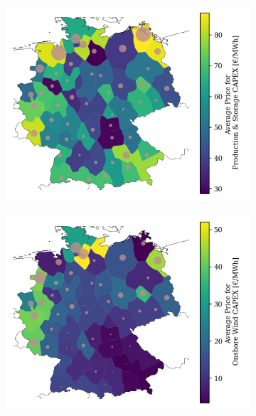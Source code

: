 \documentclass[11pt,twocolumn]{article}
\begin{document}
\begin{figure}
    \centering
    \begin{subfigure}[c]{.49\linewidth}
        \includegraphics[width=\linewidth]{de50/maps_price/one_port_investment_cost}
        \label{fig:total_capex}
    \end{subfigure}
    \begin{subfigure}[c]{.49\linewidth}
        \includegraphics[width=\linewidth]{de50/maps_price/by_carrier/onwind_one_port_investment_cost}
        \label{fig:onshore_capex}

\end{subfigure}
\end{figure}
\end{document}
